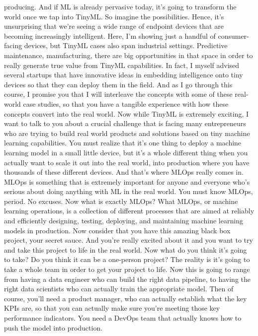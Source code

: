 producing.
And if ML is already pervasive today, it's
going to transform the world once we tap into TinyML.
So imagine the possibilities.
Hence, it's unsurprising that we're seeing a wide range of endpoint devices
that are becoming increasingly intelligent.
Here, I'm showing just a handful of consumer-facing devices,
but TinyML cases also span industrial settings.
Predictive maintenance, manufacturing, there
are big opportunities in that space in order
to really generate true value from TinyML capabilities.
In fact, I myself advised several startups
that have innovative ideas in embedding intelligence onto tiny devices
so that they can deploy them in the field.
And as I go through this course, I promise you
that I will interleave the concepts with some of these real-world case studies,
so that you have a tangible experience with how these concepts convert
into the real world.
Now while TinyML is extremely exciting, I
want to talk to you about a crucial challenge that
is facing many entrepreneurs who are trying to build real world products
and solutions based on tiny machine learning capabilities.
You must realize that it's one thing to deploy a machine learning model
in a small little device, but it's a whole different thing when you actually
want to scale it out into the real world,
into production where you have thousands of these different devices.
And that's where MLOps really comes in.
MLOps is something that is extremely important for anyone and everyone who's
serious about doing anything with ML in the real world.
You must know MLOps, period.
No excuses.
Now what is exactly MLOps?
What MLOps, or machine learning operations,
is a collection of different processes that
are aimed at reliably and efficiently designing, testing, deploying,
and maintaining machine learning models in production.
Now consider that you have this amazing black box project, your secret sauce.
And you're really excited about it and you
want to try and take this project to life in the real world.
Now what do you think it's going to take?
Do you think it can be a one-person project?
The reality is it's going to take a whole team in order
to get your project to life.
Now this is going to range from having a data engineer who
can build the right data pipeline, to having the right data
scientists who can actually train the appropriate model.
Then of course, you'll need a product manager,
who can actually establish what the key KPIs are,
so that you can actually make sure you're meeting those key performance
indicators.
You need a DevOps team that actually knows
how to push the model into production.

